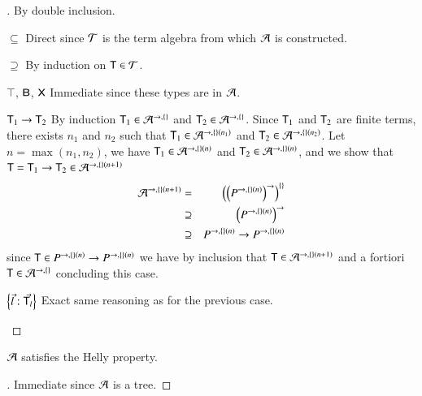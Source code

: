 \documentclass{report}
\begin{document}
  \begin{proof}[]
    By double inclusion.
    \begin{indcase}{$\subseteq$}
      Direct since $\mathcal{T}$ is the term algebra from which $\mathcal{A}$ is constructed.
    \end{indcase}
    \begin{indcase}{$\supseteq$}
      By induction on $\textsf{T}\in\mathcal{T}$.
      \begin{innerindcase}{$\top$, $\textsf{B}$, $\textsf{X}$}
        Immediate since these types are in $\mathcal{A}$.
      \end{innerindcase}
      \begin{innerindcase}{$\textsf{T}_1\rightarrow\textsf{T}_2$}
        By induction $\textsf{T}_1\in\mathcal{A}^{\rightarrow,{\{\}}}$ and $\textsf{T}_2\in\mathcal{A}^{\rightarrow,{\{\}}}$.
        Since $\textsf{T}_1$ and $\textsf{T}_2$ are finite terms, there exists $n_1$ and $n_2$ such
        that $\textsf{T}_1\in\mathcal{A}^{\rightarrow,{\{\}}(n_1)}$ and $\textsf{T}_2\in\mathcal{A}^{\rightarrow,{\{\}}(n_2)}$.
        Let $n=\max(n_1,n_2)$, we have $\textsf{T}_1\in\mathcal{A}^{\rightarrow,{\{\}}(n)}$ and $\textsf{T}_2\in\mathcal{A}^{\rightarrow,{\{\}}(n)}$,
        and we show that $\textsf{T}=\textsf{T}_1\rightarrow\textsf{T}_2\in\mathcal{A}^{\rightarrow,{\{\}}(n+1)}$
        \begin{eqnarray*}
          \mathcal{A}^{\rightarrow,{\{\}}(n+1)} &=& \left({\left({P^{\rightarrow,{\{\}}(n)}}\right)^\rightarrow}\right)^{\{\}} \\
            &\supseteq& \left({P^{\rightarrow,{\{\}}(n)}}\right)^\rightarrow \\
            &\supseteq& P^{\rightarrow,{\{\}}(n)}\rightarrow P^{\rightarrow,{\{\}}(n)}
        \end{eqnarray*}
        since $\textsf{T}\in P^{\rightarrow,{\{\}}(n)}\rightarrow P^{\rightarrow,{\{\}}(n)}$ we have by inclusion that
        $\textsf{T}\in\mathcal{A}^{\rightarrow,{\{\}}(n+1)}$ and a fortiori
        $\textsf{T}\in\mathcal{A}^{\rightarrow,{\{\}}}$ concluding this case.
      \end{innerindcase}
      \begin{innerindcase}{$\left\{\vec{l} : \vec{\textsf{T}_l}\right\}$}
        Exact same reasoning as for the previous case.
      \end{innerindcase}
    \end{indcase}
  \end{proof}
  \begin{thm}
    $\mathcal{A}$ satisfies the Helly property.
  \end{thm}
  \begin{proof}[]
    Immediate since $\mathcal{A}$ is a tree.
  \end{proof}
\end{document}
